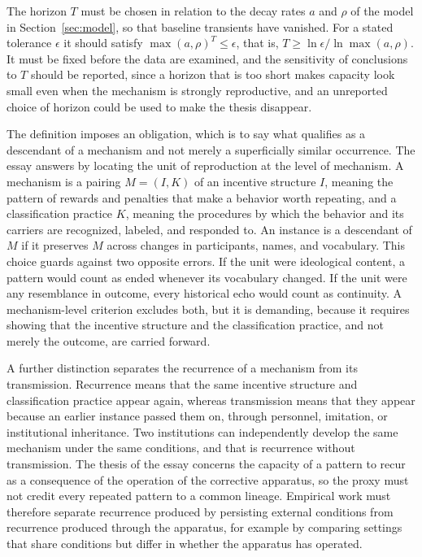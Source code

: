 \documentclass[12pt]{article}
\theoremstyle{remark}
\begin{document}
The horizon $T$ must be chosen in relation to the decay rates $a$ and $\rho$ of the model in Section~\ref{sec:model}, so that baseline transients have vanished. For a stated tolerance $\epsilon$ it should satisfy $\max(a,\rho)^{T} \le \epsilon$, that is, $T \ge \ln\epsilon / \ln\max(a,\rho)$. It must be fixed before the data are examined, and the sensitivity of conclusions to $T$ should be reported, since a horizon that is too short makes capacity look small even when the mechanism is strongly reproductive, and an unreported choice of horizon could be used to make the thesis disappear.

The definition imposes an obligation, which is to say what qualifies as a descendant of a mechanism and not merely a superficially similar occurrence. The essay answers by locating the unit of reproduction at the level of mechanism. A mechanism is a pairing $M = (I, K)$ of an incentive structure $I$, meaning the pattern of rewards and penalties that make a behavior worth repeating, and a classification practice $K$, meaning the procedures by which the behavior and its carriers are recognized, labeled, and responded to. An instance is a descendant of $M$ if it preserves $M$ across changes in participants, names, and vocabulary. This choice guards against two opposite errors. If the unit were ideological content, a pattern would count as ended whenever its vocabulary changed. If the unit were any resemblance in outcome, every historical echo would count as continuity. A mechanism-level criterion excludes both, but it is demanding, because it requires showing that the incentive structure and the classification practice, and not merely the outcome, are carried forward.

A further distinction separates the recurrence of a mechanism from its transmission. Recurrence means that the same incentive structure and classification practice appear again, whereas transmission means that they appear because an earlier instance passed them on, through personnel, imitation, or institutional inheritance. Two institutions can independently develop the same mechanism under the same conditions, and that is recurrence without transmission. The thesis of the essay concerns the capacity of a pattern to recur as a consequence of the operation of the corrective apparatus, so the proxy must not credit every repeated pattern to a common lineage. Empirical work must therefore separate recurrence produced by persisting external conditions from recurrence produced through the apparatus, for example by comparing settings that share conditions but differ in whether the apparatus has operated.
\end{document}
